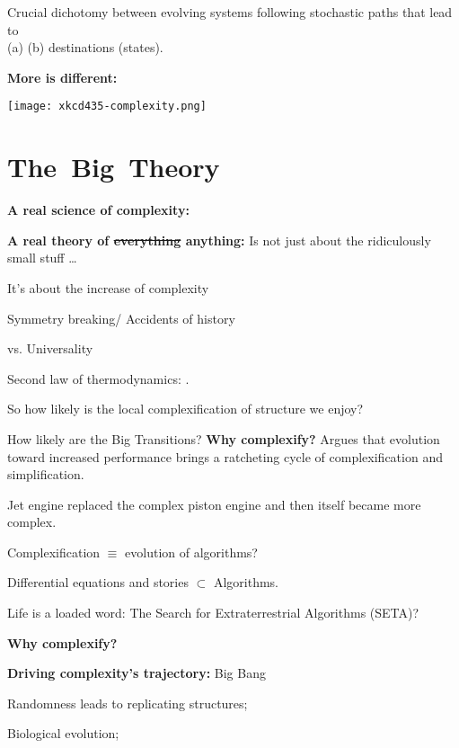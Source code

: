       Crucial dichotomy between evolving systems
      following stochastic paths that lead
      to \\
      (a)  
      (b) 
      destinations (states).

  \textbf{More is different:}

  \texttt{[image: xkcd435-complexity.png]}\\
\section{The\ Big\ Theory}
  \textbf{A real science of complexity:}

  \textbf{A real theory of \sout{everything} anything:}
      Is not just about the ridiculously small stuff \ldots
    
      It's about the increase of complexity
  \medskip
  {
      
      Symmetry breaking/
      Accidents of history
      
      vs.
      Universality
    
  }
  \medskip
  
   
    Second law of thermodynamics: .
   
    So how likely is the local complexification of structure we enjoy?
   
    How likely are the Big Transitions?
  \textbf{Why complexify?}
      Argues that evolution toward increased performance brings a
      ratcheting cycle
      of complexification and simplification.
     
      Jet engine replaced the complex piston engine and then itself
      became more complex.
     
      Complexification $\equiv$ evolution of algorithms?
      
      Differential equations and stories $\subset$ Algorithms.
      
      Life is a loaded word: The Search for Extraterrestrial Algorithms (SETA)?
  
  \textbf{Why complexify?}

  \textbf{Driving complexity's trajectory:}
      Big Bang
     
      Randomness leads to replicating structures;
     
      Biological evolution;
     
